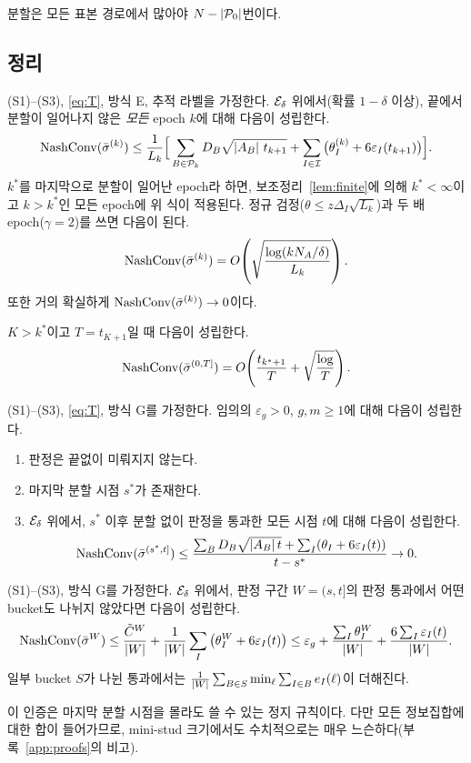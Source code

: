 \begin{lemma}[분할 유한성]\label{lem:finite}
분할은 모든 표본 경로에서 많아야 $N-\left\lvert \mathcal{P}_0\right\rvert$번이다.
\end{lemma}

\subsection{정리}
\begin{theorem}[방식 E의 수렴]\label{thm:epoch}
(S1)–(S3), \eqref{eq:T}, 방식 E, 추적 라벨을 가정한다. $\mathcal{E}_\delta$ 위에서(확률 $1-\delta$ 이상), 끝에서 분할이 일어나지 않은 \emph{모든} epoch $k$에 대해 다음이 성립한다.
\[
\mathrm{NashConv}(\bar\sigma^{(k)})\le\frac1{L_k}\Big[\sum_{B\in\mathcal{P}_k}D_B\sqrt{\left\lvert A_B\right\rvert\,t_{k+1}}+\sum_{I\in\mathcal{I}}\big(\theta_I^{(k)}+6\varepsilon_I(t_{k+1})\big)\Big].
\]
$k^*$를 마지막으로 분할이 일어난 epoch라 하면, 보조정리~\ref{lem:finite}에 의해 $k^*<\infty$이고 $k>k^*$인 모든 epoch에 위 식이 적용된다.
정규 검정($\theta\le z\Delta_I\sqrt{L_k}$)과 두 배 epoch($\gamma=2$)를 쓰면 다음이 된다.
\[
\mathrm{NashConv}(\bar\sigma^{(k)})=O\!\left(\sqrt{\frac{\log(kN_A/\delta)}{L_k}}\right).
\]
또한 거의 확실하게 $\mathrm{NashConv}(\bar\sigma^{(k)})\to0$이다.
\end{theorem}

\begin{corollary}[실행 전체의 평균]\label{cor:wholerun}
$K>k^*$이고 $T=t_{K+1}$일 때 다음이 성립한다.
\[
\mathrm{NashConv}(\bar\sigma^{(0,T]})=O\!\left(\frac{t_{k^*+1}}{T}+\sqrt{\frac{\log}{T}}\right).
\]
\end{corollary}

\begin{theorem}[방식 G의 수렴]\label{thm:gated}
(S1)–(S3), \eqref{eq:T}, 방식 G를 가정한다. 임의의 $\varepsilon_g>0$, $g,m\ge1$에 대해 다음이 성립한다.
\begin{enumerate}[label=(\roman*)]
  \item 판정은 끝없이 미뤄지지 않는다.
  \item 마지막 분할 시점 $s^*$가 존재한다.
  \item $\mathcal{E}_\delta$ 위에서, $s^*$ 이후 분할 없이 판정을 통과한 모든 시점 $t$에 대해 다음이 성립한다.
  \[
  \mathrm{NashConv}(\bar\sigma^{(s^*,t]})\le\frac{\sum_BD_B\sqrt{\left\lvert A_B\right\rvert t}+\sum_I(\theta_I+6\varepsilon_I(t))}{t-s^*}\to0.
  \]
\end{enumerate}
\end{theorem}

\begin{theorem}[$\varepsilon$ 정지 인증]\label{thm:certificate}
(S1)–(S3), 방식 G를 가정한다. $\mathcal{E}_\delta$ 위에서, 판정 구간 $W=(s,t]$의 판정 통과에서 어떤 bucket도 나뉘지 않았다면 다음이 성립한다.
\[
\mathrm{NashConv}(\bar\sigma^W)\le\frac{\tilde C^W}{\left\lvert W\right\rvert}+\frac1{\left\lvert W\right\rvert}\sum_I\big(\theta_I^W+6\varepsilon_I(t)\big)\le\varepsilon_g+\frac{\sum_I\theta_I^W}{\left\lvert W\right\rvert}+\frac{6\sum_I\varepsilon_I(t)}{\left\lvert W\right\rvert}.
\]
일부 bucket $S$가 나뉜 통과에서는 $\frac1{\left\lvert W\right\rvert}\sum_{B\in S}\min_\ell\sum_{I\in B}e_I(\ell)$이 더해진다.
\end{theorem}
\noindent 이 인증은 마지막 분할 시점을 몰라도 쓸 수 있는 정지 규칙이다. 다만 모든 정보집합에 대한 합이 들어가므로, mini-stud 크기에서도 수치적으로는 매우 느슨하다(부록~\ref{app:proofs}의 비고).

